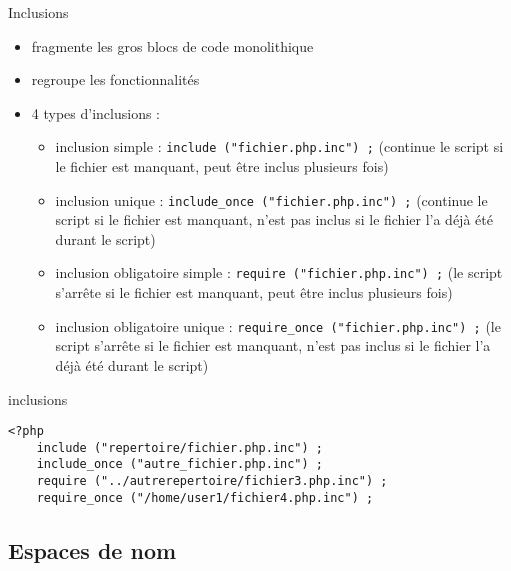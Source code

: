 \begin{frame}[containsverbatim]{Inclusions}
\begin{itemize}
\item fragmente les gros blocs de code monolithique
\item regroupe les fonctionnalités
\item 4 types d'inclusions :
\begin{itemize}
\item inclusion simple : \lstinline$include ("fichier.php.inc") ;$ (continue le script si le fichier est manquant, peut être inclus plusieurs fois)
\item inclusion unique : \lstinline$include_once ("fichier.php.inc") ;$ (continue le script si le fichier est manquant, n'est pas inclus si le fichier l'a déjà été durant le script)
\item inclusion obligatoire simple : \lstinline$require ("fichier.php.inc") ;$ (le script s'arrête si le fichier est manquant, peut être inclus plusieurs fois)
\item inclusion obligatoire unique : \lstinline$require_once ("fichier.php.inc") ;$ (le script s'arrête si le fichier est manquant, n'est pas inclus si le fichier l'a déjà été durant le script)
\end{itemize}
\end{itemize}
\begin{block}{inclusions}
\begin{lstlisting}
<?php
	include ("repertoire/fichier.php.inc") ;
	include_once ("autre_fichier.php.inc") ;
	require ("../autrerepertoire/fichier3.php.inc") ;
	require_once ("/home/user1/fichier4.php.inc") ;
\end{lstlisting}
\end{block}
\end{frame}


\subsection{Espaces de nom}

